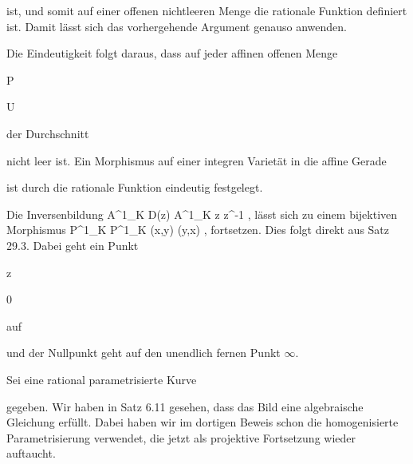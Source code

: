 {{}
{}{}{}
ist, und somit auf einer offenen nichtleeren Menge die rationale Funktion
 {} {}
definiert ist. Damit lässt sich das vorhergehende Argument genauso anwenden.


Die Eindeutigkeit folgt daraus, dass auf jeder affinen offenen Menge


\mavergleichskette

{\vergleichskette

{ P
}

{ \in }{ U
}

{  }{
}

{    }{
}

{   }{
}

}
{}{}{}
der Durchschnitt

 nicht leer ist. Ein Morphismus auf einer integren Varietät in die affine Gerade

 ist durch die rationale Funktion eindeutig festgelegt.


}



{


Die Inversenbildung
\maabbeledisp {} { {\mathbb A}^{1}_{K} \supset D(z)} { {\mathbb A}^{1}_{K} } { z } {z^{-1} } {,}
lässt sich zu einem bijektiven Morphismus
\maabbeledisp {} { {\mathbb P}^{1}_{K} } { {\mathbb P}^{1}_{K} } {(x,y)} {(y,x) } {,}
fortsetzen. Dies folgt direkt aus
Satz 29.3.
Dabei geht ein Punkt


\mavergleichskette

{\vergleichskette

{ z
}

{ \neq }{ 0
}

{  }{
}

{    }{
}

{   }{
}

}
{}{}{}
auf

 und der Nullpunkt geht auf den unendlich fernen Punkt $\infty$.


}




Sei eine rational parametrisierte Kurve

 gegeben. Wir haben in
Satz 6.11
gesehen, dass das Bild eine algebraische Gleichung erfüllt. Dabei haben wir im dortigen Beweis schon die homogenisierte Parametrisierung verwendet, die jetzt als projektive Fortsetzung wieder auftaucht.


